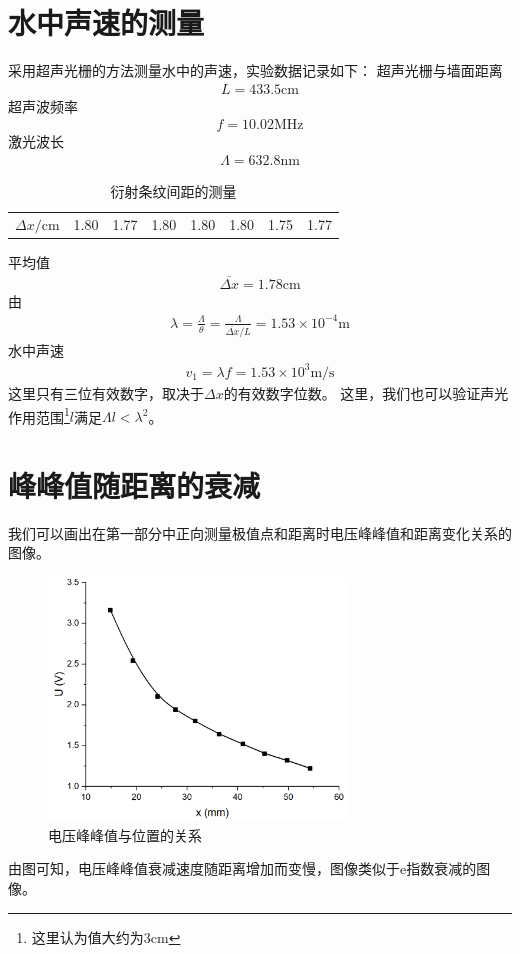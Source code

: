 \documentclass[a4paper]{ctexart}
\begin{document}
	\section{水中声速的测量}
	采用超声光栅的方法测量水中的声速，实验数据记录如下：
	超声光栅与墙面距离
	\begin{align}
		L=433.5\mathrm{cm}
	\end{align}
	超声波频率
	\begin{align}
		f=10.02\mathrm{MHz}
	\end{align}
	激光波长
	\begin{align}
		\Lambda=632.8\mathrm{nm}
	\end{align}
	\begin{table}[H]
		\begin{center}
			\caption{衍射条纹间距的测量}
			\begin{tabular}{c|ccccccc}
				$\Delta x/\mathrm{cm}$&1.80&1.77&1.80&1.80&1.80&1.75&1.77
			\end{tabular}
		\end{center}
	\end{table}
	平均值
	\begin{align}
		\overline{\Delta x}=1.78\mathrm{cm}
	\end{align}
	由
	\begin{align}
		\lambda=\frac{\Lambda}{\theta}=\frac{\Lambda}{\overline{\Delta x}/L}=1.53\times10^{-4}\mathrm{m}
	\end{align}
	水中声速
	\begin{align}
		v_1=\lambda f=1.53\times10^3\mathrm{m/s}
	\end{align}
	这里只有三位有效数字，取决于$\Delta x$的有效数字位数。
	这里，我们也可以验证声光作用范围\footnote{这里认为值大约为$3\mathrm{cm}$}$l$满足$\Lambda l<\lambda^2$。
	\section{峰峰值随距离的衰减}
	我们可以画出在第一部分中正向测量极值点和距离时电压峰峰值和距离变化关系的图像。
	\begin{figure}[H]
		\centering
		\includegraphics[width=8cm]{fig1.png}
		\caption{电压峰峰值与位置的关系}
	\end{figure}
	由图可知，电压峰峰值衰减速度随距离增加而变慢，图像类似于e指数衰减的图像。
\end{document}
